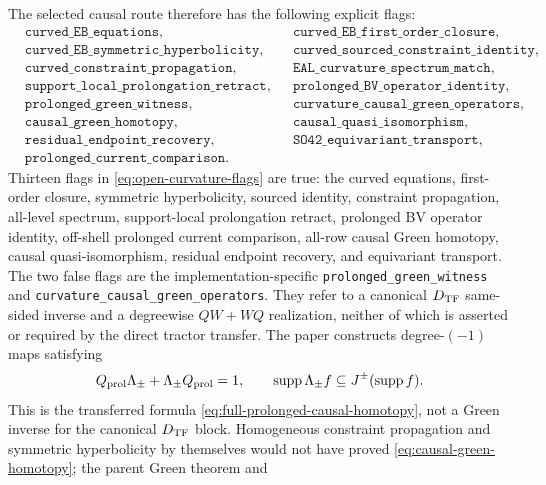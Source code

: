 \documentclass[11pt]{article}
\theoremstyle{definition}
\theoremstyle{remark}
\begin{document}
The selected causal route therefore has the following explicit flags:
\begin{equation}\label{eq:open-curvature-flags}
 \begin{aligned}
 &\texttt{curved\_EB\_equations},
 &&\texttt{curved\_EB\_first\_order\_closure},\\
 &\texttt{curved\_EB\_symmetric\_hyperbolicity},
 &&\texttt{curved\_sourced\_constraint\_identity},\\
 &\texttt{curved\_constraint\_propagation},
 &&\texttt{EAL\_curvature\_spectrum\_match},\\
 &\texttt{support\_local\_prolongation\_retract},
 &&\texttt{prolonged\_BV\_operator\_identity},\\
 &\texttt{prolonged\_green\_witness},
 &&\texttt{curvature\_causal\_green\_operators},\\
 &\texttt{causal\_green\_homotopy},
 &&\texttt{causal\_quasi\_isomorphism},\\
 &\texttt{residual\_endpoint\_recovery},
 &&\texttt{SO42\_equivariant\_transport},\\
 &\texttt{prolonged\_current\_comparison}.&&
 \end{aligned}
\end{equation}
Thirteen flags in \eqref{eq:open-curvature-flags} are true: the curved
equations, first-order closure, symmetric hyperbolicity, sourced identity,
constraint propagation, all-level spectrum, support-local prolongation
retract, prolonged BV operator identity, off-shell prolonged current
comparison, all-row causal Green homotopy, causal quasi-isomorphism, residual
endpoint recovery, and equivariant transport.  The two false flags are the
implementation-specific \texttt{prolonged\_green\_witness} and
\texttt{curvature\_causal\_green\_operators}.  They refer to a canonical
$D_{\rm TF}$ same-sided inverse and a degreewise $QW+WQ$ realization, neither
of which is asserted or required by the direct tractor transfer.  The paper
constructs degree-$(-1)$ maps satisfying
\begin{equation}\label{eq:causal-green-homotopy}
 Q_{\rm prol}\Lambda_\pm+\Lambda_\pm Q_{\rm prol}=1,
 \qquad
 \operatorname{supp}\Lambda_\pm f\subseteq J^\pm(\operatorname{supp}f).
\end{equation}
This is the transferred formula \eqref{eq:full-prolonged-causal-homotopy},
not a Green inverse for the canonical $D_{\rm TF}$ block.  Homogeneous
constraint propagation and symmetric hyperbolicity by themselves would not
have proved \eqref{eq:causal-green-homotopy}; the parent Green theorem and
\end{document}
